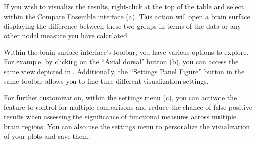 \documentclass[justified]{tufte-handout}
\begin{document}

If you wish to visualize the results, right-click at the top of the table and select  within the Compare Ensemble interface (a). This action will open a brain surface displaying the difference between these two groups in terms of the  data or any other nodal measure you have calculated.

Within the brain surface interface's toolbar, you have various options to explore. For example, by clicking on the “Axial dorsal” button (b), you can access the same view depicted in . Additionally, the “Settings Panel Figure” button in the same toolbar allows you to fine-tune different visualization settings.

For further customization, within the settings menu (c), you can activate the  feature to control for multiple comparisons and reduce the chance of false positive results when assessing the significance of functional measures across multiple brain regions. You can also use the settings menu to personalize the visualization of your plots and save them.
\end{document}
